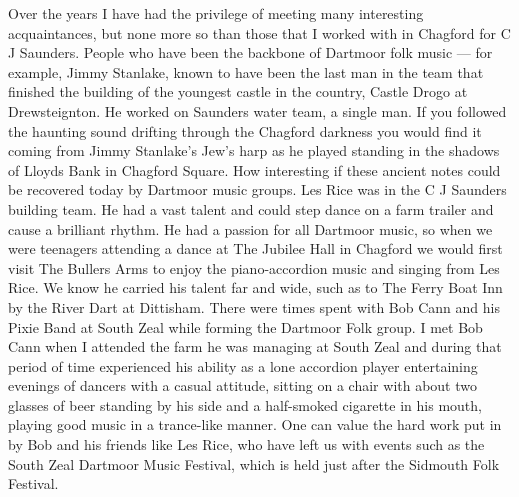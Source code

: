 Over the years I have had the privilege of meeting many interesting
acquaintances, but none more so than those that I worked with in Chagford for C
J Saunders. People who have been the backbone of Dartmoor folk music --- for
example, Jimmy Stanlake, known to have been the last man in the team that
finished the building of the youngest castle in the country, Castle Drogo at
Drewsteignton. He worked on Saunders water team, a single man. If you followed
the haunting sound drifting through the Chagford darkness you would find it
coming from Jimmy Stanlake’s Jew's harp as he played standing in the shadows of
Lloyds Bank in Chagford Square. How interesting if these ancient notes could be
recovered today by Dartmoor music groups. Les Rice was in the C J Saunders
building team. He had a vast talent and could step dance on a farm trailer and
cause a brilliant rhythm. He had a passion for all Dartmoor music, so when we
were teenagers attending a dance at The Jubilee Hall in Chagford we would first
visit The Bullers Arms to enjoy the piano-accordion music and singing from Les
Rice. We know he carried his talent far and wide, such as to The Ferry Boat Inn
by the River Dart at Dittisham. There were times spent with Bob Cann and his
Pixie Band at South Zeal while forming the Dartmoor Folk group. I met Bob Cann
when I attended the farm he was managing at South Zeal and during that period
of time experienced his ability as a lone accordion player entertaining
evenings of dancers with a casual attitude, sitting on a chair with about two
glasses of beer standing by his side and a half-smoked cigarette in his mouth,
playing good music in a trance-like manner. One can value the hard work put in
by Bob and his friends like Les Rice, who have left us with events such as the
South Zeal Dartmoor Music Festival, which is held just after the Sidmouth Folk Festival.

